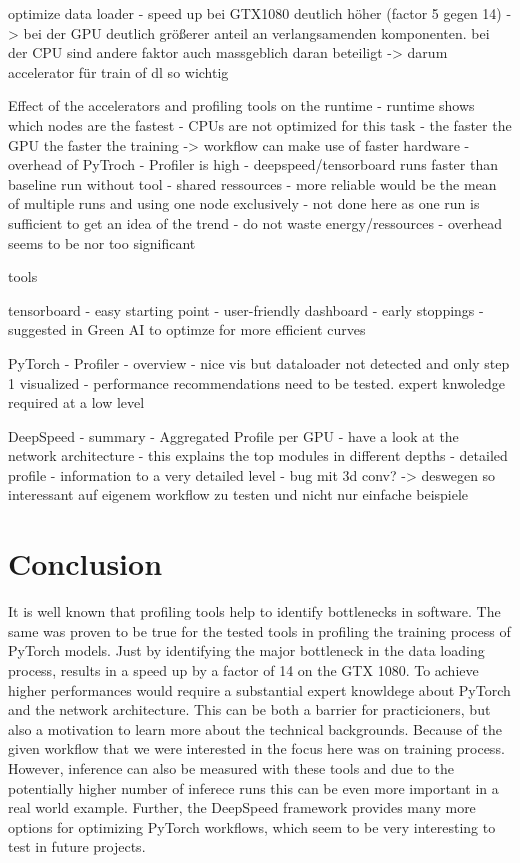 \documentclass[12pt, a4paper, hidelinks]{article}
\begin{document}
optimize data loader
    - speed up bei GTX1080 deutlich höher (factor 5 gegen 14) -> bei der GPU deutlich größerer anteil an verlangsamenden komponenten. bei der CPU sind andere faktor auch massgeblich daran beteiligt
        -> darum accelerator für train of dl so wichtig

Effect of the accelerators and profiling tools on the runtime
- runtime shows which nodes are the fastest
    - CPUs are not optimized for this task
    - the faster the GPU the faster the training -> workflow can make use of faster hardware
    - overhead of PyTroch - Profiler is high
    - deepspeed/tensorboard runs faster than baseline run without tool
        - shared ressources
        - more reliable would be the mean of multiple runs and using one node exclusively
            - not done here as one run is sufficient to get an idea of the trend
            - do not waste energy/ressources
        - overhead seems to be nor too significant

tools

tensorboard
    - easy starting point
    - user-friendly dashboard
    - early stoppings
    - suggested in Green AI to optimze for more efficient curves

PyTorch - Profiler
- overview
    - nice vis but dataloader not detected and only step 1 visualized
    - performance recommendations need to be tested. expert knwoledge required at a low level

DeepSpeed
    - summary
    - Aggregated Profile per GPU
        - have a look at the network architecture
        - this explains the top modules in different depths
    - detailed profile
        - information to a very detailed level
    - bug mit 3d conv? -> deswegen so interessant auf eigenem workflow zu testen und nicht nur einfache beispiele

\fi


\section{Conclusion}
\label{sec:conclusion}

It is well known that profiling tools help to identify bottlenecks in software. The same was proven to be true for the tested tools in profiling the training process of PyTorch models. Just by identifying the major bottleneck in the data loading process, results in a speed up by a factor of 14 on the GTX 1080.
To achieve higher performances would require a substantial expert knowldege about PyTorch and the network architecture. This can be both a barrier for practicioners, but also a motivation to learn more about the technical backgrounds.
Because of the given workflow that we were interested in the focus here was on training process. However, inference can also be measured with these tools and due to the potentially higher number of inferece runs this can be even more important in a real world example.
Further, the DeepSpeed framework provides many more options for optimizing PyTorch workflows, which seem to be very interesting to test in future projects.
\end{document}
